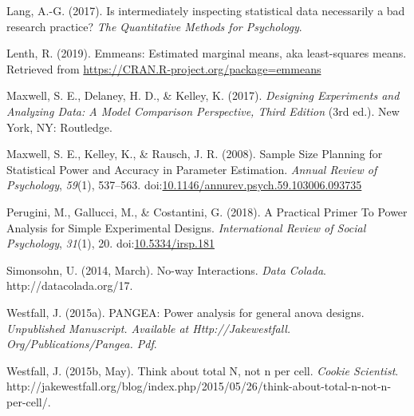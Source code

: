 \documentclass[
  ,man,floatsintext]{apa6}
\begin{document}
\leavevmode\hypertarget{ref-lang2017intermediately}{}%
Lang, A.-G. (2017). Is intermediately inspecting statistical data necessarily a bad research practice? \emph{The Quantitative Methods for Psychology}.

\leavevmode\hypertarget{ref-lenthemmeans}{}%
Lenth, R. (2019). Emmeans: Estimated marginal means, aka least-squares means. Retrieved from \url{https://CRAN.R-project.org/package=emmeans}

\leavevmode\hypertarget{ref-maxwell_designing_2017}{}%
Maxwell, S. E., Delaney, H. D., \& Kelley, K. (2017). \emph{Designing Experiments and Analyzing Data: A Model Comparison Perspective, Third Edition} (3rd ed.). New York, NY: Routledge.

\leavevmode\hypertarget{ref-maxwell_sample_2008}{}%
Maxwell, S. E., Kelley, K., \& Rausch, J. R. (2008). Sample Size Planning for Statistical Power and Accuracy in Parameter Estimation. \emph{Annual Review of Psychology}, \emph{59}(1), 537--563. doi:\href{https://doi.org/10.1146/annurev.psych.59.103006.093735}{10.1146/annurev.psych.59.103006.093735}

\leavevmode\hypertarget{ref-perugini_practical_2018}{}%
Perugini, M., Gallucci, M., \& Costantini, G. (2018). A Practical Primer To Power Analysis for Simple Experimental Designs. \emph{International Review of Social Psychology}, \emph{31}(1), 20. doi:\href{https://doi.org/10.5334/irsp.181}{10.5334/irsp.181}

\leavevmode\hypertarget{ref-simonsohn_no-way_2014}{}%
Simonsohn, U. (2014, March). No-way Interactions. \emph{Data Colada}. http://datacolada.org/17.

\leavevmode\hypertarget{ref-westfall2015pangea}{}%
Westfall, J. (2015a). PANGEA: Power analysis for general anova designs. \emph{Unpublished Manuscript. Available at Http://Jakewestfall. Org/Publications/Pangea. Pdf}.

\leavevmode\hypertarget{ref-westfall_think_2015}{}%
Westfall, J. (2015b, May). Think about total N, not n per cell. \emph{Cookie Scientist}. http://jakewestfall.org/blog/index.php/2015/05/26/think-about-total-n-not-n-per-cell/.
\end{document}
